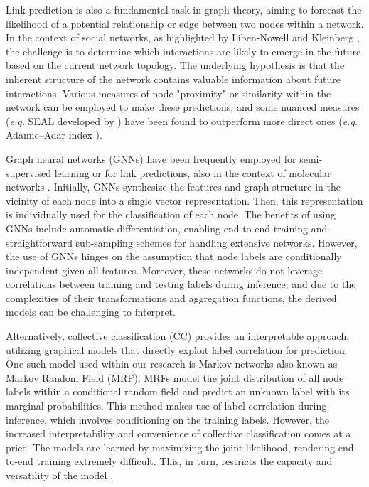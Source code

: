 \documentclass[
11pt, %
oneside, %
english, %
singlespacing, %
headsepline, %
chapterinoneline, %
]{MastersDoctoralThesis} %
\begin{document}
Link prediction is also a fundamental task in graph theory, aiming to forecast the likelihood of a potential relationship or edge between two nodes within a network. In the context of social networks, as highlighted by Liben-Nowell and Kleinberg \cite{liben-nowellLinkPredictionProblem2003}, the challenge is to determine which interactions are likely to emerge in the future based on the current network topology. The underlying hypothesis is that the inherent structure of the network contains valuable information about future interactions. Various measures of node "proximity" or similarity within the network can be employed to make these predictions, and some nuanced measures (\textit{e.g.} SEAL developed by \cite{zhangLinkPredictionBased2018}) have been found to outperform more direct ones (\textit{e.g.} Adamic–Adar index \cite{adamicFriendsNeighborsWeb2003}).

Graph neural networks (GNNs) \cite{wuGraphNeuralNetworks2022} have been frequently employed for semi-supervised learning or for link predictions, also in the context of molecular networks \cite{oyetundeBoostGAPFILLImprovingFidelity2017}. Initially, GNNs synthesize the features and graph structure in the vicinity of each node into a single vector representation. Then, this representation is individually used for the classification of each node. The benefits of using GNNs include automatic differentiation, enabling end-to-end training and straightforward sub-sampling schemes for handling extensive networks. However, the use of GNNs hinges on the assumption that node labels are conditionally independent given all features. Moreover, these networks do not leverage correlations between training and testing labels during inference, and due to the complexities of their transformations and aggregation functions, the derived models can be challenging to interpret.

Alternatively, collective classification (CC) \cite{senCollectiveClassificationNetwork2008} provides an interpretable approach, utilizing graphical models that directly exploit label correlation for prediction. One such model used within our research is Markov networks also known as Markov Random Field (MRF). MRFs model the joint distribution of all node labels within a conditional random field and predict an unknown label with its marginal probabilities. This method makes use of label correlation during inference, which involves conditioning on the training labels. However, the increased interpretability and convenience of collective classification comes at a price. The models are learned by maximizing the joint likelihood, rendering end-to-end training extremely difficult. This, in turn, restricts the capacity and versatility of the model \cite{jiaGraphBeliefPropagation2021}.
\end{document}
